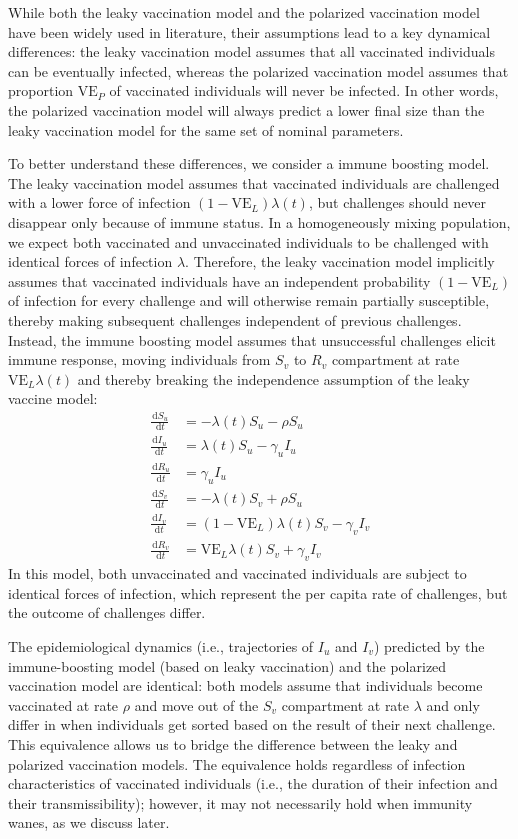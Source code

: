 \documentclass[12pt]{article}
\newcommand{\dd}[1]{\ensuremath{\, \mathrm{d}#1}}
\newcommand{\VE}{\ensuremath{\textrm{VE}}}
\begin{document}
While both the leaky vaccination model and the polarized vaccination model have been widely used in literature, their assumptions lead to a key dynamical differences: the leaky vaccination model assumes that all vaccinated individuals can be eventually infected, whereas the polarized vaccination model assumes that proportion $\VE_P$ of vaccinated individuals will never be infected.
In other words, the polarized vaccination model will always predict a lower final size than the leaky vaccination model for the same set of nominal parameters.

To better understand these differences, we consider a immune boosting model.
The leaky vaccination model assumes that vaccinated individuals are challenged with a lower force of infection $(1-\VE_L) \lambda(t)$, but challenges should never disappear only because of immune status.
In a homogeneously mixing population, we expect both vaccinated and unvaccinated individuals to be challenged with identical forces of infection $\lambda$.
Therefore, the leaky vaccination model implicitly assumes that vaccinated individuals have an independent probability $(1-\VE_L)$ of infection for every challenge and will otherwise remain partially susceptible, thereby making subsequent challenges independent of previous challenges.
Instead, the immune boosting model assumes that unsuccessful challenges elicit immune response, moving individuals from $S_v$ to $R_v$ compartment at rate $\VE_L \lambda(t)$ and thereby breaking the independence assumption of the leaky vaccine model:  
\begin{align}
\frac{\dd S_u}{\dd t} &= - \lambda(t) S_u - \rho S_u \\
\frac{\dd I_u}{\dd t} &= \lambda(t) S_u - \gamma_u I_u \\
\frac{\dd R_u}{\dd t} &= \gamma_u I_u \\
\frac{\dd S_v}{\dd t} &= - \lambda(t) S_v + \rho S_u \\
\frac{\dd I_v}{\dd t} &= (1-\VE_L) \lambda(t) S_v - \gamma_v I_v \\
\frac{\dd R_v}{\dd t} &= \VE_L \lambda(t) S_v + \gamma_v I_v
\end{align}
In this model, both unvaccinated and vaccinated individuals are subject to identical forces of infection, which represent the per capita rate of challenges, but the outcome of challenges differ.

The epidemiological dynamics (i.e., trajectories of $I_u$ and $I_v$) predicted by the immune-boosting model (based on leaky vaccination) and the polarized vaccination model are identical: 
both models assume that individuals become vaccinated at rate $\rho$ and move out of the $S_v$ compartment at rate $\lambda$ and only differ in when individuals get sorted based on the result of their next challenge.
This equivalence allows us to bridge the difference between the leaky and polarized vaccination models.
The equivalence holds regardless of infection characteristics of vaccinated individuals (i.e., the duration of their infection and their transmissibility);
however, it may not necessarily hold when immunity wanes, as we discuss later.
\end{document}
